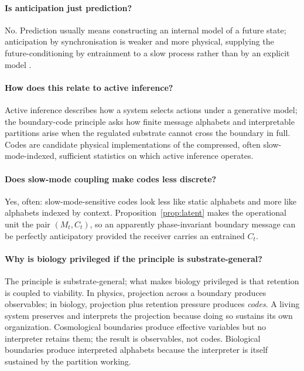 \documentclass[12pt]{article}
\theoremstyle{definition}
\begin{document}
\paragraph{Is anticipation just prediction?} No. Prediction usually means constructing an internal model of a future state; anticipation by synchronisation is weaker and more physical, supplying the future-conditioning by entrainment to a slow process rather than by an explicit model \citep{rosen1985,igamberdiev2014}.

\paragraph{How does this relate to active inference?} Active inference \citep{friston2010} describes how a system selects actions under a generative model; the boundary-code principle asks how finite message alphabets and interpretable partitions arise when the regulated substrate cannot cross the boundary in full. Codes are candidate physical implementations of the compressed, often slow-mode-indexed, sufficient statistics on which active inference operates.

\paragraph{Does slow-mode coupling make codes less discrete?} Yes, often: slow-mode-sensitive codes look less like static alphabets and more like alphabets indexed by context. Proposition~\ref{prop:latent} makes the operational unit the pair $(M_t,C_t)$, so an apparently phase-invariant boundary message can be perfectly anticipatory provided the receiver carries an entrained $C_t$.

\paragraph{Why is biology privileged if the principle is substrate-general?} The principle is substrate-general; what makes biology privileged is that retention is coupled to viability. In physics, projection across a boundary produces observables; in biology, projection plus retention pressure produces \emph{codes}. A living system preserves and interprets the projection because doing so sustains its own organization. Cosmological boundaries produce effective variables but no interpreter retains them; the result is observables, not codes. Biological boundaries produce interpreted alphabets because the interpreter is itself sustained by the partition working.
\end{document}
